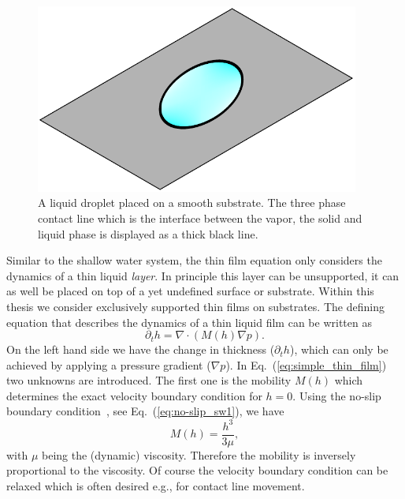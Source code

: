 \begin{figure}
    \centering
    \includegraphics[width=0.95\textwidth]{graphics/contact_line.pdf}
    \caption{A liquid droplet placed on a smooth substrate.
    The three phase contact line which is the interface between the vapor, the solid and liquid phase is displayed as a thick black line.}
    \label{fig:contact_line_drop}
\end{figure}
Similar to the shallow water system, the thin film equation only considers the dynamics of a thin liquid \textit{layer}. 
In principle this layer can be unsupported, it can as well be placed on top of a yet undefined surface or substrate.
Within this thesis we consider exclusively supported thin films on substrates.
The defining equation that describes the dynamics of a thin liquid film can be written as~\cite{thielePatternedDepositionMoving2014, oronLongscaleEvolutionThin1997, crasterDynamicsStabilityThin2009, bonnWettingSpreading2009} 
\begin{equation}\label{eq:simple_thin_film}
    \partial_t h = \nabla\cdot\left(M(h)\nabla p\right).
\end{equation}
On the left hand side we have the change in thickness ($\partial_t h$), which can only be achieved by applying a pressure gradient ($\nabla p$).
In Eq.~(\ref{eq:simple_thin_film}) two unknowns are introduced.
The first one is the mobility $M(h)$ which determines the exact velocity boundary condition for $h=0$.
Using the no-slip boundary condition~\cite{beckerThinfilmEquationRecent2005}, see Eq.~(\ref{eq:no-slip_sw1}), we have 
\begin{equation}\label{eq:no-slip-mobility}
    M(h) = \frac{h^3}{3\mu},
\end{equation}
with $\mu$ being the (dynamic) viscosity. 
Therefore the mobility is inversely proportional to the viscosity.
Of course the velocity boundary condition can be relaxed which is often desired e.g., for contact line movement.

